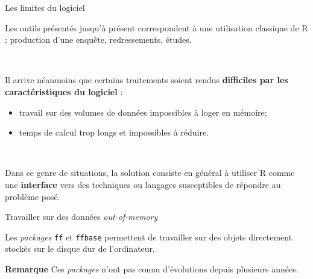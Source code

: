 \documentclass[12pt,handout,ignorenonframetext,]{beamer}
\newenvironment{Shaded}{}{}
\newcommand{\KeywordTok}[1]{\textcolor[rgb]{0.00,0.00,1.00}{{#1}}}
\newcommand{\DataTypeTok}[1]{{#1}}
\newcommand{\StringTok}[1]{\textcolor[rgb]{0.00,0.50,0.50}{{#1}}}
\newcommand{\CommentTok}[1]{\textcolor[rgb]{0.00,0.50,0.00}{{#1}}}
\newcommand{\OtherTok}[1]{\textcolor[rgb]{1.00,0.25,0.00}{{#1}}}
\newcommand{\NormalTok}[1]{{#1}}
\providecommand{\tightlist}{%
\setlength{\itemsep}{0pt}\setlength{\parskip}{0pt}}
\renewenvironment{Shaded}{\begin{snugshade}}{\end{snugshade}}
\begin{document}
\begin{frame}{Les limites du logiciel}

Les outils présentés jusqu'à présent correspondent à une utilisation
\og classique \fg{} de R : production d'une enquête, redressements,
études.

~

Il arrive néanmoins que certains traitements soient rendus
\textbf{difficiles par les caractéristiques du logiciel} :

\begin{itemize}
\tightlist
\item
  travail sur des volumes de données impossibles à loger en mémoire;
\item
  temps de calcul trop longs et impossibles à réduire.
\end{itemize}

~

Dans ce genre de situations, la solution consiste en général à utiliser
R comme une \textbf{interface} vers des techniques ou langages
susceptibles de répondre au problème posé.

\end{frame}

\begin{frame}[fragile]{\large Travailler sur des données
\emph{out-of-memory}}

Les \emph{packages} \texttt{ff} et \texttt{ffbase} permettent de
travailler sur des objets directement stockés sur le disque dur de
l'ordinateur.

\footnotesize

\begin{Shaded}
\end{Shaded}

\normalsize

\textbf{Remarque} Ces \emph{packages} n'ont pas connu d'évolutions
depuis plusieurs années.

\end{frame}
\end{document}
